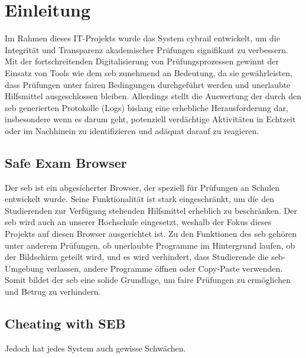\chapter{Einleitung} \label{ch:einleitung}

Im Rahmen dieses IT-Projekts wurde das System \gls{cybrail} entwickelt, um die Integrität und Transparenz akademischer Prüfungen signifikant zu verbessern.\\
Mit der fortschreitenden Digitalisierung von Prüfungsprozessen gewinnt der Einsatz von Tools wie dem \gls{seb} zunehmend an Bedeutung, da sie gewährleisten, dass Prüfungen unter fairen Bedingungen durchgeführt werden und unerlaubte Hilfsmittel ausgeschlossen bleiben. Allerdings stellt die Auswertung der durch den \gls{seb} generierten Protokolle (Logs) bislang eine erhebliche Herausforderung dar, insbesondere wenn es darum geht, potenziell verdächtige Aktivitäten in Echtzeit oder im Nachhinein zu identifizieren und adäquat darauf zu reagieren.

\section{Safe Exam Browser}
Der \gls{seb} ist ein abgesicherter Browser, der speziell für Prüfungen an Schulen entwickelt wurde. 
Seine Funktionalität ist stark eingeschränkt, um die den Studierenden zur Verfügung stehenden Hilfsmittel erheblich zu beschränken.
Der \gls{seb} wird auch an unserer Hochschule eingesetzt, weshalb der Fokus dieses Projekts auf diesen Browser ausgerichtet ist. 
Zu den Funktionen des \gls{seb} gehören unter anderem Prüfungen, ob unerlaubte Programme im Hintergrund laufen, ob der Bildschirm geteilt wird, und es wird verhindert, dass Studierende die \gls{seb}-Umgebung verlassen, andere Programme öffnen oder Copy-Paste verwenden. 
Somit bildet der \gls{seb} eine solide Grundlage, um faire Prüfungen zu ermöglichen und Betrug zu verhindern.
\section{Cheating with SEB}
Jedoch hat jedes System auch gewisse Schwächen.

